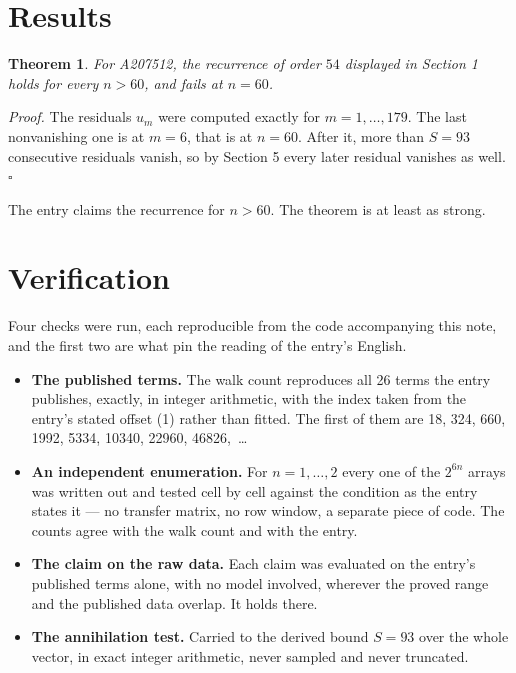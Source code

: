 \documentclass[11pt]{article}
\newtheorem{theorem}{Theorem}
\theoremstyle{definition}
\begin{document}
\section{Results}

\begin{theorem} For A207512, the recurrence of order $54$ displayed in Section 1 holds for every $n > 60$, and fails at $n = 60$.\end{theorem}

{\itshape Proof.} The residuals $u_m$ were computed exactly for $m = 1,\dots,179$. The last nonvanishing one is at $m = 6$, that is at $n = 60$. After it, more than $S = 93$ consecutive residuals vanish, so by Section 5 every later residual vanishes as well. $\square$

The entry claims the recurrence for $n > 60$. The theorem is at least as strong.

\section{Verification}

Four checks were run, each reproducible from the code accompanying this note, and the first two are what pin the reading of the entry's English.

\begin{itemize}

\item {\bfseries The published terms.} The walk count reproduces all 26 terms the entry publishes, exactly, in integer arithmetic, with the index taken from the entry's stated offset (1) rather than fitted. The first of them are 18, 324, 660, 1992, 5334, 10340, 22960, 46826,~\dots

\item {\bfseries An independent enumeration.} For $n = 1,\dots,2$ every one of the $2^{6n}$ arrays was written out and tested cell by cell against the condition as the entry states it --- no transfer matrix, no row window, a separate piece of code. The counts agree with the walk count and with the entry.

\item {\bfseries The claim on the raw data.} Each claim was evaluated on the entry's published terms alone, with no model involved, wherever the proved range and the published data overlap. It holds there.

\item {\bfseries The annihilation test.} Carried to the derived bound $S = 93$ over the whole vector, in exact integer arithmetic, never sampled and never truncated.

\end{itemize}
\end{document}
